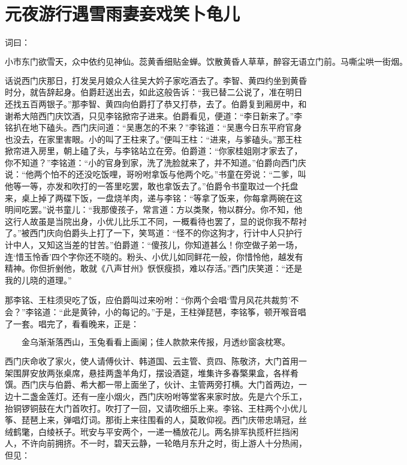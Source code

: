 

\chapter{元夜游行遇雪雨\KG 妻妾戏笑卜龟儿}


词曰：

\[
小市东门欲雪天，众中依约见神仙。蕊黄香细贴金蝉。饮散黄昏人草草，醉容无语立门前。马嘶尘哄一街烟。
\]

话说西门庆那日，打发吴月娘众人往吴大妗子家吃酒去了。李智、黄四约坐到黄昏时分，就告辞起身。伯爵赶送出去，如此这般告诉：“我已替二公说了，准在明日还找五百两银子。”那李智、黄四向伯爵打了恭又打恭，去了。伯爵复到厢房中，和谢希大陪西门庆饮酒，只见李铭掀帘子进来。伯爵看见，便道：“李日新来了。”李铭扒在地下磕头。西门庆问道：“吴惠怎的不来？”李铭道：“吴惠今日东平府官身也没去，在家里害眼。小的叫了王柱来了。”便叫王柱：“进来，与爹磕头。”那王柱掀帘进入房里，朝上磕了头，与李铭站立在旁。伯爵道：“你家桂姐刚才家去了，你不知道？”李铭道：“小的官身到家，洗了洗脸就来了，并不知道。”伯爵向西门庆说：“他两个怕不的还没吃饭哩，哥吩咐拿饭与他两个吃。”书童在旁说：“二爹，叫他等一等，亦发和吹打的一答里吃罢，敢也拿饭去了。”伯爵令书童取过一个托盘来，桌上掉了两碟下饭，一盘烧羊肉，递与李铭：“等拿了饭来，你每拿两碗在这明间吃罢。”说书童儿：“我那傻孩子，常言道：方以类聚，物以群分。你不知，他这行人故虽是当院出身，小优儿比乐工不同，一概看待也罢了，显的说你我不帮衬了。”被西门庆向伯爵头上打了一下，笑骂道：“怪不的你这狗才，行计中人只护行计中人，又知这当差的甘苦。”伯爵道：“傻孩儿，你知道甚么！你空做子弟一场，连‘惜玉怜香’四个字你还不晓的。粉头、小优儿如同鲜花一般，你惜怜他，越发有精神。你但折剉他，敢就《八声甘州》恹恹瘦损，难以存活。”西门庆笑道：“还是我的儿晓的道理。”

那李铭、王柱须臾吃了饭，应伯爵叫过来吩咐：“你两个会唱‘雪月风花共裁剪’不会？”李铭道：“此是黄钟，小的每记的。”于是，王柱弹琵琶，李铭筝，顿开喉音唱了一套。唱完了，看看晚来，正是：

\[
金乌渐渐落西山，玉兔看看上画阑；
佳人款款来传报，月透纱窗衾枕寒。
\]

西门庆命收了家火，使人请傅伙计、韩道国、云主管、贲四、陈敬济，大门首用一架围屏安放两张桌席，悬挂两盏羊角灯，摆设酒筵，堆集许多春檠果盒，各样肴馔。西门庆与伯爵、希大都一带上面坐了，伙计、主管两旁打横。大门首两边，一边十二盏金莲灯。还有一座小烟火，西门庆吩咐等堂客来家时放。先是六个乐工，抬铜锣铜鼓在大门首吹打。吹打了一回，又请吹细乐上来。李铭、王柱两个小优儿筝、琵琶上来，弹唱灯词。那街上来往围看的人，莫敢仰视。西门庆带忠靖冠，丝绒鹤氅，白绫袄子。玳安与平安两个，一递一桶放花儿。两名排军执揽杆拦挡闲人，不许向前拥挤。不一时，碧天云静，一轮皓月东升之时，街上游人十分热闹，但见：

